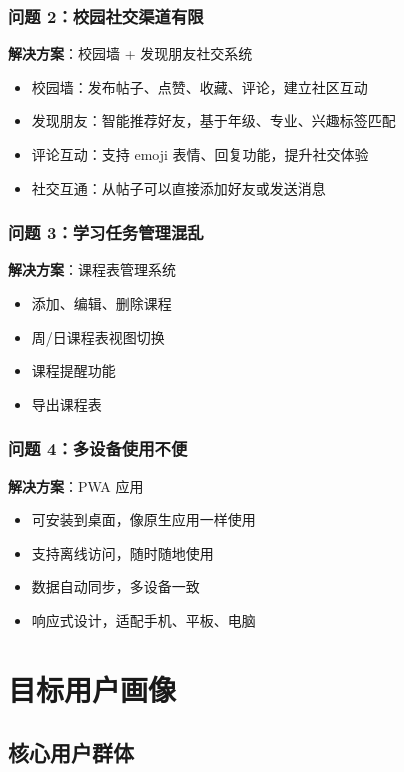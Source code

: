 \documentclass[12pt,a4paper]{article}
\begin{document}
\subsubsection{问题 2：校园社交渠道有限}

\textbf{解决方案}：校园墙 + 发现朋友社交系统
\begin{itemize}
    \item 校园墙：发布帖子、点赞、收藏、评论，建立社区互动
    \item 发现朋友：智能推荐好友，基于年级、专业、兴趣标签匹配
    \item 评论互动：支持 emoji 表情、回复功能，提升社交体验
    \item 社交互通：从帖子可以直接添加好友或发送消息
\end{itemize}

\subsubsection{问题 3：学习任务管理混乱}

\textbf{解决方案}：课程表管理系统
\begin{itemize}
    \item 添加、编辑、删除课程
    \item 周/日课程表视图切换
    \item 课程提醒功能
    \item 导出课程表
\end{itemize}

\subsubsection{问题 4：多设备使用不便}

\textbf{解决方案}：PWA 应用
\begin{itemize}
    \item 可安装到桌面，像原生应用一样使用
    \item 支持离线访问，随时随地使用
    \item 数据自动同步，多设备一致
    \item 响应式设计，适配手机、平板、电脑
\end{itemize}

\section{目标用户画像}

\subsection{核心用户群体}
\end{document}

